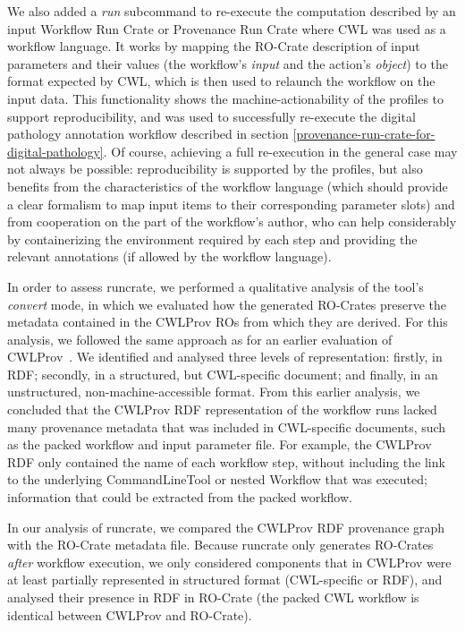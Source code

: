 \documentclass[10pt,letterpaper]{article}
\begin{document}
We also added a \emph{run} subcommand to re-execute the computation described by an input Workflow Run Crate or Provenance Run Crate where CWL was used as a workflow language.
It works by mapping the RO-Crate description of input parameters and their values (the workflow's
\emph{input} and the action's \emph{object}) to the format expected by CWL, which is then used to relaunch the workflow on the input data.
This functionality shows the machine-actionability of the profiles to support reproducibility, and was used to successfully re-execute the digital pathology annotation workflow described in section \ref{provenance-run-crate-for-digital-pathology}.
Of course, achieving a full re-execution in the general case may not always be possible: reproducibility is supported by the profiles, but also benefits from the characteristics of the workflow language (which should provide a clear formalism to map input items to their corresponding parameter slots) and from cooperation on the part of the workflow's author, who can help considerably by containerizing the environment required by each step and providing the relevant annotations (if allowed by the workflow language).

In order to assess runcrate, we performed a qualitative analysis of the tool's \emph{convert} mode, in which we evaluated how the generated RO-Crates preserve the metadata contained in the CWLProv ROs from which they are derived.
For this analysis, we followed the same approach as for an earlier evaluation of CWLProv~\cite{De Wit 2022}.
We identified and analysed three levels of representation:
firstly, in RDF; secondly, in a structured, but CWL-specific document;
and finally, in an unstructured, non-machine-accessible format.
From this earlier analysis, we concluded that the CWLProv RDF representation of the workflow runs lacked many provenance metadata that was included in CWL-specific documents, such as the packed workflow and input parameter file.
For example, the CWLProv RDF only contained the name of each workflow step, without including the link to the underlying CommandLineTool or nested Workflow that was executed; information that could be extracted from the packed workflow.

In our analysis of runcrate, we compared the CWLProv RDF provenance graph with the RO-Crate metadata file.
Because runcrate only generates RO-Crates \emph{after} workflow execution, we only considered components that in CWLProv were at least partially represented in structured format (CWL-specific or RDF), and analysed their presence in RDF in RO-Crate (the packed CWL workflow is identical between CWLProv and RO-Crate).
\end{document}

